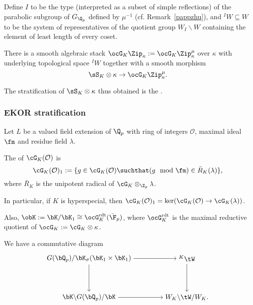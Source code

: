 \documentclass[a4paper]{scrartcl} %
\numberwithin{equation}{section}
\begin{document}
\begin{Definition}
  Define $I$ to be the type (interpreted as a subset of simple reflections) of the parabolic subgroup of $G_{\Q_p}$ defined by $\mu^{-1}$ (cf. Remark~\ref{pappzhu}), and $^IW\subseteq W$ to be the system of representatives of the quotient group $W_I\backslash W$ containing the element of least length of every coset.
\end{Definition}

\begin{Theorem} \textnormal{\cite{mw,PWZ,PWZ-AZD,zhangEO}}
  There is a smooth algebraic stack $\ocG_K\Zip_\kappa:=\ocG_K\Zip^\mu_\kappa$ over $\kappa$ with underlying topological space $^IW$ together with a smooth morphism
  \begin{equation*}
    \sS_K\otimes\kappa \to \ocG_K\Zip^\mu_\kappa.
  \end{equation*}

  The stratification of $\sS_K\otimes\kappa$ thus obtained is the .
\end{Theorem}




\subsubsection{EKOR stratification}
\label{sec:ekor-stratification}

\begin{Definition}
  Let $L$ be a valued field extension of $\Q_p$ with ring of integers $\mathcal{O}$, maximal ideal $\fm$ and residue field $\lambda$.

  The  of $\cG_K(\mathcal{O})$ is
  \begin{equation*}
    \cG_K(\mathcal{O})_1 := \{ g \in \cG_K(\mathcal{O}) \suchthat (g \mod \fm)\in \bar{R}_K(\lambda) \},
  \end{equation*}
  where $\bar{R}_K$ is the unipotent radical of $\cG_K\otimes_{\Z_p}\lambda$.
\end{Definition}

In particular, if $K$ is hyperspecial, then $\cG_K(\mathcal{O})_1=\ker(\cG_K(\mathcal{O})\to \cG_K(\lambda))$.

Also, $\obK:=\bK/\bK_1\cong \ocG_K^\mathrm{rdt}(\bar\F_p)$, where $\ocG_K^\mathrm{rdt}$ is the maximal reductive quotient of $\ocG_K:=\cG_K\otimes\kappa$.


\begin{Remark} \textnormal{\cite[after~Cor.~6.2]{he-rapo}}\label{iw-diagr}
  We have a commutative diagram
  \begin{equation*}
    \begin{tikzpicture}[node distance=4cm, auto]
      \node (X) at (0,2) {$G(\bQ_p)/\bK_\sigma(\bK_1\times\bK_1)$};
      \node (Z) at (5,2) {$^K\tW$};
      \node (Zs) at (5,0) {$W_K\backslash \tW/W_K.$};
      \node (Xs) at (0,0) {$\bK\backslash G(\bQ_p)/\bK$};
      
      \draw[->] (X) to (Xs);
      \draw[->] (Z) to  (Zs);
      \draw[->] (X) to  (Z);
      \draw[->] (Xs) to  (Zs);
    \end{tikzpicture}
  \end{equation*}
\end{Remark}
\end{document}
